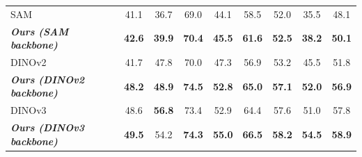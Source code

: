 \begin{table}[ht]
{\begin{tabular}{l|ccccccc>{\columncolor{gray!20}}c}
    \midrule
    SAM & 41.1 & 36.7 & 69.0 & 44.1 & 58.5 & 52.0 & 35.5 & 48.1 \\
    \rowcolor{lightgreen} 
    \textit{\textbf{Ours \footnotesize{(SAM backbone)}}} & \textbf{42.6} & \textbf{39.9} & \textbf{70.4} & \textbf{45.5} & \textbf{61.6} & \textbf{52.5} & \textbf{38.2} & \textbf{50.1} \\
     \midrule
    DINOv2& 41.7 & 47.8 & 70.0 & 47.3 & 56.9 & 53.2 & 45.5 &51.8 \\
    \rowcolor{lightgreen} 
    \textit{\textbf{Ours \footnotesize{(DINOv2 backbone)}}} &\textbf{48.2} &\textbf{48.9} &\textbf{74.5}  & \textbf{52.8} & \textbf{65.0} & \textbf{57.1} & \textbf{52.0} & \textbf{56.9}  \\
    \midrule
    DINOv3 & 48.6 & \textbf{56.8} & 73.4 & 52.9 & 64.4 & 57.6 & 51.0 & 57.8 \\
    \rowcolor{lightgreen} 
    \textit{\textbf{Ours \footnotesize{(DINOv3 backbone)}}} & \textbf{49.5} & 54.2 & \textbf{74.3} & \textbf{55.0} & \textbf{66.5} & \textbf{58.2} & \textbf{54.5} & \textbf{58.9} \\
   
    
    \bottomrule
    \end{tabular}%
    }
\end{table}

